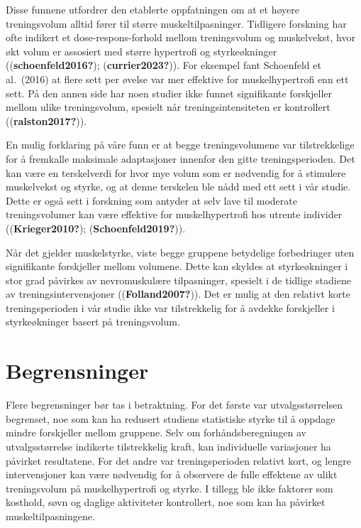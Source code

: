 \documentclass[
  letterpaper,
  DIV=11,
  numbers=noendperiod]{scrreprt}
\begin{document}
Disse funnene utfordrer den etablerte oppfatningen om at et høyere
treningsvolum alltid fører til større muskeltilpasninger. Tidligere
forskning har ofte indikert et dose-respons-forhold mellom treningsvolum
og muskelvekst, hvor økt volum er assosiert med større hypertrofi og
styrkeøkninger ((\textbf{schoenfeld2016?}); (\textbf{currier2023?})).
For eksempel fant Schoenfeld et al.~(2016) at flere sett per øvelse var
mer effektive for muskelhypertrofi enn ett sett. På den annen side har
noen studier ikke funnet signifikante forskjeller mellom ulike
treningsvolum, spesielt når treningsintensiteten er kontrollert
((\textbf{ralston2017?})).

En mulig forklaring på våre funn er at begge treningsvolumene var
tilstrekkelige for å fremkalle maksimale adaptasjoner innenfor den gitte
treningsperioden. Det kan være en terskelverdi for hvor mye volum som er
nødvendig for å stimulere muskelvekst og styrke, og at denne terskelen
ble nådd med ett sett i vår studie. Dette er også sett i forskning som
antyder at selv lave til moderate treningsvolumer kan være effektive for
muskelhypertrofi hos utrente individer ((\textbf{Krieger2010?});
(\textbf{Schoenfeld2019?})).

Når det gjelder muskelstyrke, viste begge gruppene betydelige
forbedringer uten signifikante forskjeller mellom volumene. Dette kan
skyldes at styrkeøkninger i stor grad påvirkes av nevromuskulære
tilpasninger, spesielt i de tidlige stadiene av treningsintervensjoner
((\textbf{Folland2007?})). Det er mulig at den relativt korte
treningsperioden i vår studie ikke var tilstrekkelig for å avdekke
forskjeller i styrkeøkninger basert på treningsvolum.

\section{Begrensninger}\label{begrensninger}

Flere begrensninger bør tas i betraktning. For det første var
utvalgsstørrelsen begrenset, noe som kan ha redusert studiens
statistiske styrke til å oppdage mindre forskjeller mellom gruppene.
Selv om forhåndsberegningen av utvalgsstørrelse indikerte tilstrekkelig
kraft, kan individuelle variasjoner ha påvirket resultatene. For det
andre var treningsperioden relativt kort, og lengre intervensjoner kan
være nødvendig for å observere de fulle effektene av ulikt treningsvolum
på muskelhypertrofi og styrke. I tillegg ble ikke faktorer som kosthold,
søvn og daglige aktiviteter kontrollert, noe som kan ha påvirket
muskeltilpasningene.
\end{document}
